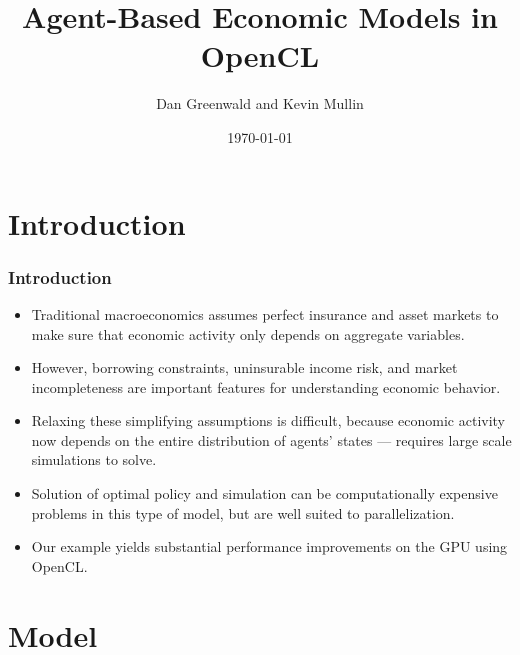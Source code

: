 \documentclass[handout]{beamer}
\title{Agent-Based Economic Models in OpenCL}
\author{Dan Greenwald and Kevin Mullin}
\date{\today}
\newcommand{\E}{\mathbb{E}}
\theoremstyle{definition}
\begin{document}
\small

\frame{\titlepage}

\section{Introduction}

\begin{frame}
  \frametitle{Introduction}
  \begin{itemize}[<+->]
  \item Traditional macroeconomics assumes perfect insurance and asset markets to make sure that economic activity only depends on aggregate variables.
  \item However, borrowing constraints, uninsurable income risk, and market incompleteness are important features for understanding economic behavior.
  \item Relaxing these simplifying assumptions is difficult, because economic activity now depends on the entire distribution of agents' states --- requires large scale simulations to solve.
  \item Solution of optimal policy and simulation can be computationally expensive problems in this type of model, but are well suited to parallelization.
  \item Our example yields substantial performance improvements on the GPU using OpenCL.
  \end{itemize}
\end{frame}

\section{Model}

\end{document}

